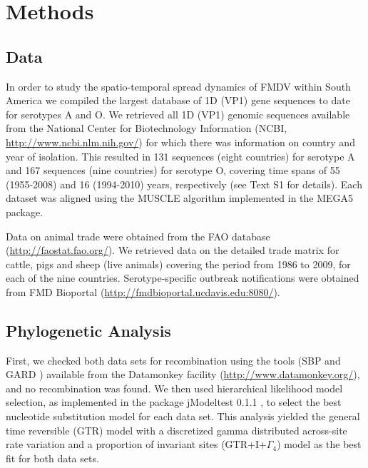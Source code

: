 \documentclass[10pt]{article}
\begin{document}
\section*{Methods}

\subsection*{Data}

In order to study the spatio-temporal spread dynamics of FMDV within South America we compiled the largest database of 1D (VP1) gene sequences to date for serotypes A and O. We retrieved all 1D (VP1) genomic sequences available from the National Center for Biotechnology Information (NCBI, \url{ http://www.ncbi.nlm.nih.gov/}) for which there was information on country and year of isolation.  This resulted in 131 sequences (eight countries) for serotype A and 167 sequences (nine countries) for serotype O, covering time spans of 55 (1955-2008) and 16 (1994-2010) years, respectively (see Text S1 for details). Each dataset was aligned using the MUSCLE algorithm implemented in the MEGA5 \cite{MEGA} package.

Data on animal trade were obtained from the FAO database (\url{http://faostat.fao.org/}). We retrieved data on the detailed trade matrix for cattle, pigs and sheep (live animals) covering the period from 1986 to 2009, for each of the nine countries. Serotype-specific outbreak notifications were obtained from FMD Bioportal (\url{http://fmdbioportal.ucdavis.edu:8080/}).


\subsection*{Phylogenetic Analysis}

First, we checked both data sets for recombination using the tools (SBP and GARD \cite{sbpgard}) available from the Datamonkey facility (\url{http://www.datamonkey.org/}), and no recombination was found. We then used hierarchical likelihood model selection, as implemented in the package jModeltest 0.1.1 \cite{jmodel}, to select the best nucleotide 
substitution model for each data set. This analysis yielded the general time reversible (GTR) model with a discretized gamma distributed across-site rate variation and a proportion of invariant sites (GTR+I+$\Gamma_{4}$) model as the best fit for both data sets.
\end{document}
